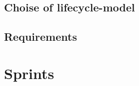 \documentclass[12pt]{report}
\begin{document}
	


		
		

		

		

		

		

		

		

		


		

		

		
		

\chapter{Choise of lifecycle-model}

	

	

\chapter{Requirements}
	
	

\part{Sprints}


	

	
\end{document}
